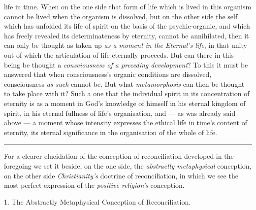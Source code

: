 \documentclass[12pt,a4paper]{book}
\begin{document}
life in time. When on the one side that form of life which is lived in this
organism cannot be lived when the organism is dissolved, but on the other side
the self which has unfolded its life of spirit on the basis of the
psychic-organic, and which has freely revealed its determinateness by eternity,
cannot be annihilated, then it can only be thought as taken up \emph{as a moment
in the Eternal's life}, in that unity out of which the articulation of life
eternally proceeds. But can there in this being be thought a \emph{consciousness
of a preceding development}? To this it must be answered that when
consciousness's organic conditions are dissolved, consciousness \emph{as such}
cannot be. But what \emph{metamorphosis} can then be thought to take place with
it? Such a one that the individual spirit in its concentration of eternity is as
a moment in God's knowledge of himself in his eternal kingdom of spirit, in his
eternal fullness of life's organisation,
and --- as was already said above --- a moment whose intensity expresses the
ethical life in time's content of eternity, its eternal significance in the
organisation of the whole of life.

\begin{center}\rule{2cm}{0.4pt}\end{center}

For a clearer elucidation of the conception of reconciliation developed in the
foregoing we set it beside, on the one side, the \emph{abstractly metaphysical}
conception, on the other side \emph{Christianity's} doctrine of reconciliation,
in which we see the most perfect expression of the \emph{positive religion's}
conception.

\begin{center}
1. The Abstractly Metaphysical Conception of Reconciliation.
\end{center}
\end{document}

